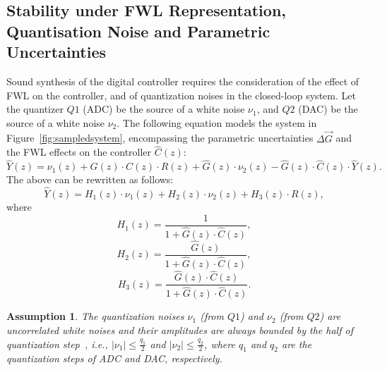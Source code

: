 \documentclass[final]{sig-alternate-05-2015}
\newtheorem{myassumption}{Assumption}
\begin{document}
%

\subsection{Stability under FWL Representation, Quantisation Noise and Parametric Uncertainties}
\label{sec:stability}

Sound synthesis of the digital controller requires the consideration of the effect of FWL on the controller, 
and of quantization noises in the closed-loop system.  
Let the quantizer $Q1$ (ADC) be the source of a white noise $\nu_{1}$, 
and $Q2$ (DAC) be the source of a white noise $\nu_{2}$.  The following equation
models the system in Figure~\ref{fig:sampledsystem}, encompassing the
parametric uncertainties $\Delta \vec{G}$ and the FWL effects on
the controller $\hat{C}(z)$:
%
\begin{equation}
\hat{Y}(z)=\nu_{1}(z)+\hat{G}(z)\cdot C(z)\cdot R(z)+\hat{G}(z)\cdot\nu_{2}(z)-\hat{G}(z)\cdot \hat{C}(z)\cdot \hat{Y}(z). 
\end{equation}
%
The above can be rewritten as follows:
%
\begin{equation}
\label{eq:outputfunctions}
\hat{Y}(z)=H_{1}(z)\cdot\nu_{1}(z)+H_{2}(z)\cdot\nu_{2}(z)+H_{3}(z)\cdot R(z),
\end{equation}
%
where
%
\begin{equation*}
H_{1}(z)=\frac{1}{1+\hat{G}(z)\cdot \hat{C}(z)}, 
\end{equation*}
%
\begin{equation*}
H_{2}(z)=\frac{\hat{G}(z)}{1+\hat{G}(z)\cdot \hat{C}(z)}, 
\end{equation*}
%
\begin{equation*}
H_{3}(z)=\frac{\hat{G}(z)\cdot \hat{C}(z)}{1+\hat{G}(z)\cdot \hat{C}(z)}. 
\end{equation*}

\begin{myassumption}
\label{whitenoise}
%
The quantization noises $\nu_{1}$ (from $Q1$) and $\nu_{2}$ (from $Q2$) are
uncorrelated white noises and their amplitudes are always bounded by the
half of quantization step~\cite{astrom1997computer}, i.e., $\vert \nu_{1}
\vert \leq \frac{q_{1}}{2}$ and $\vert \nu_{2} \vert \leq \frac{q_{2}}{2}$,
where $q_{1}$ and $q_{2}$ are the quantization steps of ADC and DAC, respectively.
% 
\end{myassumption}
\end{document}
